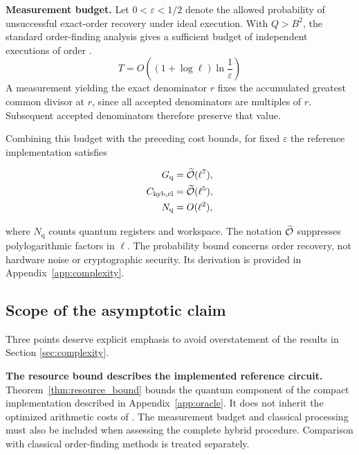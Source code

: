\begin{revision}
\textbf{Measurement budget.}
Let $0<\varepsilon<1/2$ denote the allowed probability of unsuccessful exact-order recovery under ideal execution. With $Q>B^2$, the standard order-finding analysis gives a sufficient budget of independent executions of order \cite{Shor1997}.
\begin{equation}
    \label{eq:measurement_budget}
    T=O\!\left(
    (1+\log\ell)\ln\frac{1}{\varepsilon}
    \right)
\end{equation}
A measurement yielding the exact denominator $r$ fixes the accumulated greatest common divisor at $r$, since all accepted denominators are multiples of $r$. Subsequent accepted denominators therefore preserve that value.

Combining this budget with the preceding cost bounds, for fixed $\varepsilon$ the reference implementation satisfies

\begin{equation}
    \label{eq:fixed_error_resources}
    \begin{aligned}
        G_{\mathrm q}&=\widetilde{\mathcal{O}}(\ell^7),\\
        C_{\mathrm{hyb,cl}}&=\widetilde{\mathcal{O}}(\ell^5),\\
        N_{\mathrm q}&=O(\ell^2),
    \end{aligned}
\end{equation}

where $N_{\mathrm q}$ counts quantum registers and workspace. The notation $\widetilde{\mathcal{O}}$  suppresses polylogarithmic factors in $\ell$. The probability bound concerns order recovery, not hardware noise or cryptographic security. Its derivation is provided in Appendix~\ref{app:complexity}.
\end{revision}

\subsection{Scope of the asymptotic claim}\label{sec:scope}

Three points deserve explicit emphasis to avoid overstatement of the results in Section \ref{sec:complexity}.

\begin{revision}
\textbf{The resource bound describes the implemented reference circuit.}
Theorem~\ref{thm:resource_bound} bounds the quantum component of the compact implementation described in Appendix~\ref{app:oracle}. It does not inherit the optimized arithmetic costs of \cite{Roetteler2017,Haner2020}. The measurement budget and classical processing must also be included when assessing the complete hybrid procedure. Comparison with classical order-finding methods is treated separately.
\end{revision}


